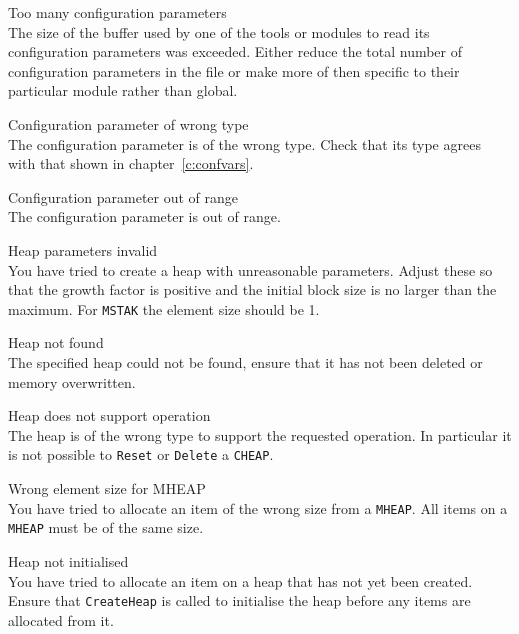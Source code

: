 \begin{itemize}
\begin{itemize}
    Too many configuration parameters\\
        The size of the buffer used by one of the tools or modules to read
        its configuration parameters was exceeded.  Either reduce the total
        number of configuration parameters in the file or make more of then
        specific to their particular module rather than global.

    Configuration parameter of wrong type\\
        The configuration parameter is of the wrong type.  Check that its type 
        agrees with that shown in chapter~\ref{c:confvars}.

    Configuration parameter out of range\\
        The configuration parameter is out of range.  

\end{itemize}


\begin{itemize}
    Heap parameters invalid\\
        You have tried to create a heap with unreasonable parameters.  Adjust 
        these so that the growth factor is positive and the initial block 
        size is no larger than the maximum.  For \texttt{MSTAK} the element 
        size should be 1.

    Heap not found\\
        The specified heap could not be found, ensure that it has not been 
        deleted or memory overwritten.

    Heap does not support operation\\
        The heap is of the wrong type to support the requested operation.  In 
        particular it is not possible to \texttt{Reset} or \texttt{Delete} a
        \texttt{CHEAP}.

    Wrong element size for MHEAP\\
        You have tried to allocate an item of the wrong size from a 
        \texttt{MHEAP}. All items on a \texttt{MHEAP} must be of the same size.

    Heap not initialised\\
        You have tried to allocate an item on a heap that has not yet been 
        created.  Ensure that \texttt{CreateHeap} is called to initialise 
        the heap before any items are allocated from it.


\end{itemize}
\end{itemize}
